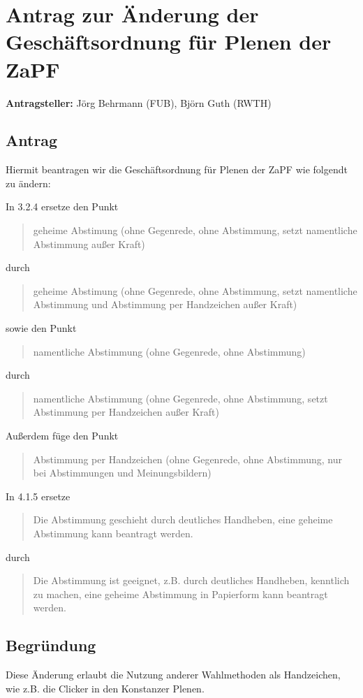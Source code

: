 \documentclass[draft,10pt,oneside]{scrartcl}
\begin{document}
\section*{Antrag zur Änderung der Geschäftsordnung für Plenen der ZaPF}

\textbf{Antragsteller:} Jörg Behrmann (FUB), Björn Guth (RWTH)

\subsection*{Antrag}

Hiermit beantragen wir die Geschäftsordnung für Plenen der ZaPF wie folgendt zu ändern:

In 3.2.4 ersetze den Punkt
\begin{quote}
	geheime Abstimung (ohne Gegenrede, ohne Abstimmung, setzt namentliche
	Abstimmung außer Kraft)
\end{quote}
durch
\begin{quote}
	geheime Abstimung (ohne Gegenrede, ohne Abstimmung, setzt namentliche
	Abstimmung und Abstimmung per Handzeichen außer Kraft)
\end{quote}
sowie den Punkt
\begin{quote}
	namentliche Abstimmung (ohne Gegenrede, ohne Abstimmung)
\end{quote}
durch
\begin{quote}
	namentliche Abstimmung (ohne Gegenrede, ohne Abstimmung, setzt Abstimmung
	per Handzeichen außer Kraft)
\end{quote}
Außerdem füge den Punkt
\begin{quote}
	Abstimmung per Handzeichen (ohne Gegenrede, ohne Abstimmung, nur bei
	Abstimmungen und Meinungsbildern)
\end{quote}
\vspace{0.25cm}
In 4.1.5 ersetze
\begin{quote}
	Die Abstimmung geschieht durch deutliches Handheben, eine geheime
	Abstimmung kann beantragt werden.
\end{quote}
durch
\begin{quote}
	Die Abstimmung ist geeignet, z.B. durch deutliches Handheben, kenntlich zu
	machen, eine geheime Abstimmung in Papierform kann beantragt werden.
\end{quote}

\subsection*{Begründung}
Diese Änderung erlaubt die Nutzung anderer Wahlmethoden als Handzeichen, wie
z.B. die Clicker in den Konstanzer Plenen.
\end{document}
